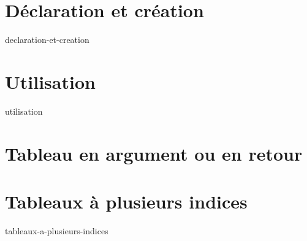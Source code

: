 \section{Déclaration et création}\label{sec:declaration-et-creation}
    {declaration-et-creation}

\section{Utilisation}
    {utilisation}

\section{Tableau en argument ou en retour}\label{sec:tableau-en-argument-ou-en-retour}

\section{Tableaux à plusieurs indices}\label{sec:tableaux-a-plusieurs-indices}
    {tableaux-a-plusieurs-indices}